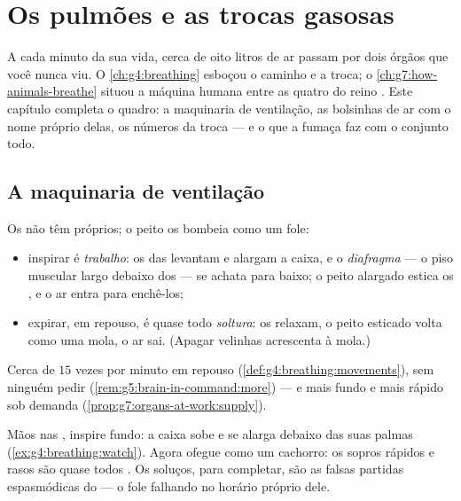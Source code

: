 \chapter{Os pulmões e as trocas gasosas}\label{ch:g7:lungs-and-gas-exchange}

A cada minuto da sua vida, cerca de oito litros de ar passam por dois
órgãos que você nunca viu. O \cref{ch:g4:breathing} esboçou o caminho
e a troca; o \cref{ch:g7:how-animals-breathe} situou a máquina humana
entre as quatro do reino . Este capítulo completa o quadro: a
maquinaria de ventilação, as bolsinhas de ar com o nome próprio delas,
os números da troca --- e o que a fumaça faz com o conjunto todo.

\section{A maquinaria de ventilação}

\begin{proposition}\label{prop:g7:lungs-and-gas-exchange:ventilation}
Os  não têm  próprios; o peito os bombeia como um fole:
\begin{itemize}
  \item inspirar é \emph{trabalho}: os  das  levantam
        e alargam a caixa, e o \emph{diafragma} --- o
        piso muscular largo debaixo dos  --- se achata para
        baixo; o peito alargado estica os , e o ar entra para
        enchê-los;
  \item expirar, em repouso, é quase todo \emph{soltura}: os 
        relaxam, o peito esticado volta como uma mola, o ar sai.
        (Apagar velinhas acrescenta  à mola.)
\end{itemize}
Cerca de $15$ vezes por minuto em repouso
(\cref{def:g4:breathing:movements}), sem ninguém pedir
(\cref{rem:g5:brain-in-command:more}) --- e mais fundo e mais rápido
sob demanda (\cref{prop:g7:organs-at-work:supply}).
\end{proposition}
\admitted

\begin{example}\label{ex:g7:lungs-and-gas-exchange:feel}
Mãos nas , inspire fundo: a caixa sobe e se alarga debaixo das
suas palmas (\cref{ex:g4:breathing:watch}). Agora ofegue como um
cachorro: os sopros rápidos e rasos são quase todos . Os
soluços, para completar, são as falsas partidas espasmódicas do
 --- o fole falhando no horário próprio dele.
\end{example}

